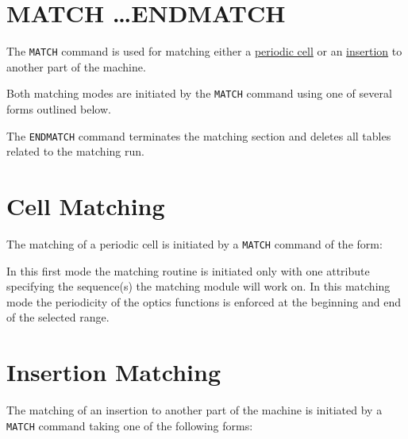 

%




\section{MATCH \ldots ENDMATCH}
\label{sec:match}\label{sec:endmatch}

The {\tt MATCH} command is used for matching either a \hyperref[sec:cell]{periodic cell}
or an \hyperref[sec:insertion]{insertion} to another part of the machine. 

Both matching modes are initiated by the {\tt MATCH} command using
one of several forms outlined below. 

The {\tt ENDMATCH} command terminates the matching section and deletes
all tables related to the matching run. 


\section{Cell Matching}
\label{sec:cell}

The matching of a periodic cell is initiated by a {\tt MATCH} command of
the form:


In this first mode the matching routine is initiated only with one
attribute specifying the sequence(s) the matching module will work
on. In this matching mode the periodicity of the optics functions is
enforced at the beginning and end of the selected range. 
    


\section{Insertion Matching}
\label{sec:insertion}
The matching of an insertion to another part of the machine is initiated
by a {\tt MATCH} command taking one of the following forms:

